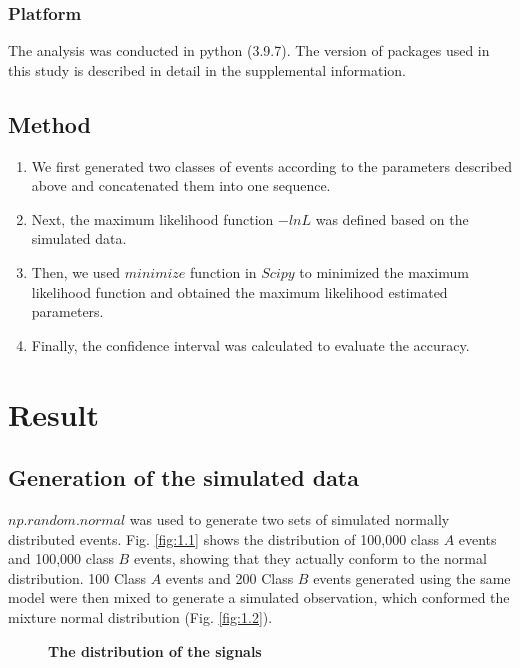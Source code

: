 \documentclass[10pt,a4paper,twocolumn,twoside,UTF8]{article}
\begin{document}
		\subsubsection{Platform}
		The analysis was conducted in python (3.9.7). 
		The version of packages used in this study is described in detail in the supplemental information.

	\subsection{Method}
		\begin{enumerate}[label=\arabic*.]
			\item We first generated two classes of events according to the parameters described above and concatenated them into one sequence.
			\item Next, the maximum likelihood function $-lnL$ was defined based on the simulated data.
			\item Then, we used $minimize$ function in $Scipy$ to minimized the maximum likelihood function and obtained the maximum likelihood estimated parameters.
			\item Finally, the confidence interval was calculated to evaluate the accuracy.
		\end{enumerate}

\section{Result}
	\subsection{Generation of the simulated data}
		$np.random.normal$ was used to generate two sets of simulated normally distributed events. 
		Fig. \ref{fig:1.1} shows the distribution of 100,000 class $A$ events and 100,000 class $B$ events, showing that they actually conform to the normal distribution.
		100 Class $A$ events and 200 Class $B$ events generated using the same model were then mixed to generate a simulated observation, which conformed the mixture normal distribution (Fig. \ref{fig:1.2}).
		\begin{figure}[htbp]
			\centering
			\caption{\textbf{The distribution of the signals}}
		\end{figure}
\end{document}
